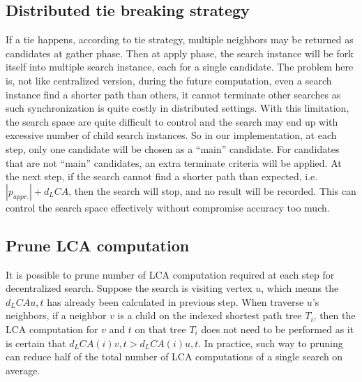 \subsection{Distributed tie breaking strategy}
If a tie happens, according to tie strategy, multiple neighbors may be returned as candidates at gather phase. Then at apply phase, the search instance will be fork itself into multiple search instance, each for a single candidate. The problem here is, not like centralized version, during the future computation, even a search instance find a shorter path than others, it cannot terminate other searches as such synchronization is quite costly in distributed settings. With this limitation, the search space are quite difficult to control and the search may end up with excessive number of child search instances. So in our implementation, at each step, only one candidate will be chosen as a "`main"' candidate. For candidates that are not "`main"' candidates, an extra terminate criteria will be applied. At the next step, if the search cannot find a shorter path than expected, i.e. $|p_{appr.}| + d_LCA$, then the search will stop, and no result will be recorded. This can control the search space effectively without compromise accuracy too much.

\subsection{Prune LCA computation}
It is possible to prune number of LCA computation required at each step for decentralized search. Suppose the search is visiting vertex $u$, which means the $d_LCA{u, t}$ has already been calculated in previous step. When traverse $u$'s neighbors, if a neighbor $v$ is a child on the indexed shortest path tree $T_i$, then the LCA computation for $v$ and $t$ on that tree $T_i$ does not need to be performed as it is certain that $d_LCA(i){v, t} > d_LCA(i){u, t}$. In practice, such way to pruning can reduce half of the total number of LCA computations of a single search on average.
